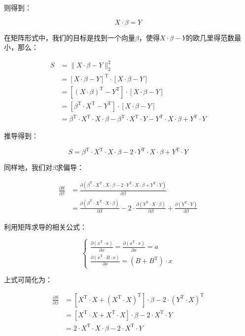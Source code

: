 \documentclass[11pt,a4paper]{elegantpaper}
\begin{document}
\begin{multicols}{2}
则得到：

$$
X\cdot \beta = Y
$$

在矩阵形式中，我们的目标是找到一个向量$\beta$，使得$X\cdot\beta-Y$的欧几里得范数最小，那么：

$$
\begin{aligned}
S &=\|X \cdot \beta-Y\|_{2}^{2} \\
&=[X \cdot \beta-Y]^{\mathrm{T}} \cdot[X \cdot \beta-Y] \\
&=\left[(X \cdot \beta)^{\mathrm{T}}-Y^{\mathrm{T}}\right] \cdot[X \cdot \beta-Y] \\
&=\left[\beta^{\mathrm{T}} \cdot X^{\mathrm{T}}-Y^{\mathrm{T}}\right] \cdot[X \cdot \beta-Y] \\
&=\beta^{\mathrm{T}} \cdot X^{\mathrm{T}} \cdot X \cdot \beta-\beta^{\mathrm{T}} \cdot X^{\mathrm{T}} \cdot Y-Y^{\mathrm{T}} \cdot X \cdot \beta+Y^{\mathrm{T}} \cdot Y
\end{aligned}
$$

推导得到：

$$
S=\beta^{\mathrm{T}} \cdot X^{\mathrm{T}} \cdot X \cdot \beta-2 \cdot Y^{\mathrm{T}} \cdot X \cdot \beta+Y^{\mathrm{T}} \cdot Y
$$

同样地，我们对$\beta$求偏导：

$$
\begin{aligned}
\frac{\partial S}{\partial \beta} &=\frac{\partial\left(\beta^{\mathrm{T}} \cdot X^{\mathrm{T}} \cdot X \cdot \beta-2 \cdot Y^{\mathrm{T}} \cdot X \cdot \beta+Y^{\mathrm{T}} \cdot Y\right)}{\partial \beta} \\
&=\frac{\partial\left(\beta^{\mathrm{T}} \cdot X^{\mathrm{T}} \cdot X \cdot \beta\right)}{\partial \beta}-2 \cdot \frac{\partial\left(Y^{\mathrm{T}} \cdot X \cdot \beta\right)}{\partial \beta}+\frac{\partial\left(Y^{\mathrm{T}} \cdot Y\right)}{\partial \beta}
\end{aligned}
$$

利用矩阵求导的相关公式：

$$
\left\{\begin{array}{l}
\frac{\partial\left(x^{\mathrm{T}} \cdot a\right)}{\partial x}=\frac{\partial\left(a^{\mathrm{T}} \cdot x\right)}{\partial x}=a \\
\frac{\partial\left(x^{\mathrm{T}} \cdot B \cdot x\right)}{\partial x}=\left(B+B^{\mathrm{T}}\right) \cdot x
\end{array}\right.
$$

上式可简化为：

$$
\begin{aligned}
\frac{\partial S}{\partial \beta} &=\left[X^{\mathrm{T}} \cdot X+\left(X^{\mathrm{T}} \cdot X\right)^{\mathrm{T}}\right] \cdot \beta-2 \cdot\left(Y^{\mathrm{T}} \cdot X\right)^{\mathrm{T}} \\
&=\left[X^{\mathrm{T}} \cdot X+X^{\mathrm{T}} \cdot X\right] \cdot \beta-2 \cdot X^{\mathrm{T}} \cdot Y \\
&=2 \cdot X^{\mathrm{T}} \cdot X \cdot \beta-2 \cdot X^{\mathrm{T}} \cdot Y
\end{aligned}
$$


\end{multicols}
\end{document}
